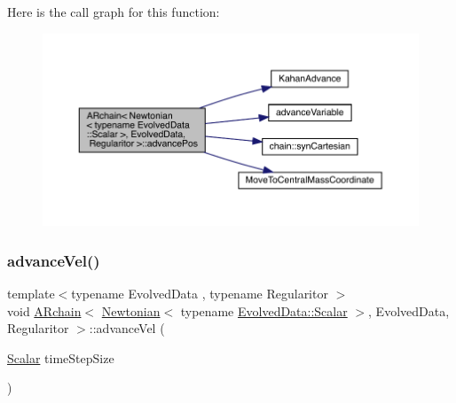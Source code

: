 Here is the call graph for this function\+:
\nopagebreak
\begin{figure}[H]
\begin{center}
\leavevmode
\includegraphics[width=350pt]{class_a_rchain_3_01_newtonian_3_01typename_01_evolved_data_1_1_scalar_01_4_00_01_evolved_data_00_01_regularitor_01_4_adffd5a74134d2a87e4f07908ea5beef4_cgraph}
\end{center}
\end{figure}
\mbox{\label{class_a_rchain_3_01_newtonian_3_01typename_01_evolved_data_1_1_scalar_01_4_00_01_evolved_data_00_01_regularitor_01_4_ad11d21617228157e755aa334d9c621a7}} 
\subsubsection{\texorpdfstring{advance\+Vel()}{advanceVel()}}
{\footnotesize\ttfamily template$<$typename Evolved\+Data , typename Regularitor $>$ \\
void \mbox{\hyperlink{class_a_rchain}{A\+Rchain}}$<$ \mbox{\hyperlink{class_newtonian}{Newtonian}}$<$ typename \mbox{\hyperlink{class_a_rchain_a707e42a79e4744424a34c9007e84ee07}{Evolved\+Data\+::\+Scalar}} $>$, Evolved\+Data, Regularitor $>$\+::advance\+Vel (\begin{DoxyParamCaption}\item[{\mbox{\hyperlink{class_a_rchain_3_01_newtonian_3_01typename_01_evolved_data_1_1_scalar_01_4_00_01_evolved_data_00_01_regularitor_01_4_a2c77dc1b58a25ac5c6ee95dd7809f693}{Scalar}}}]{time\+Step\+Size }\end{DoxyParamCaption})}

